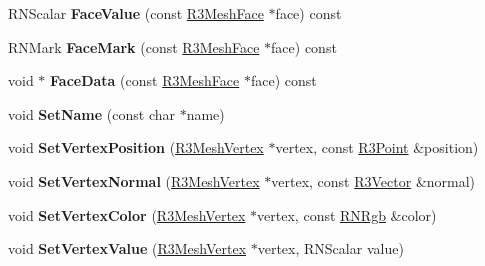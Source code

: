\begin{DoxyCompactItemize}
\item 
R\+N\+Scalar {\bfseries Face\+Value} (const \hyperlink{class_r3_mesh_face}{R3\+Mesh\+Face} $\ast$face) const \hypertarget{class_r3_mesh_a06524fba258d4d294f19f621079c6fc8}{}\label{class_r3_mesh_a06524fba258d4d294f19f621079c6fc8}

\item 
R\+N\+Mark {\bfseries Face\+Mark} (const \hyperlink{class_r3_mesh_face}{R3\+Mesh\+Face} $\ast$face) const \hypertarget{class_r3_mesh_a766b1c1ff18ecdb72a1a02b93cb4961e}{}\label{class_r3_mesh_a766b1c1ff18ecdb72a1a02b93cb4961e}

\item 
void $\ast$ {\bfseries Face\+Data} (const \hyperlink{class_r3_mesh_face}{R3\+Mesh\+Face} $\ast$face) const \hypertarget{class_r3_mesh_a62c2b5b91b088723a9e27957b236fc7a}{}\label{class_r3_mesh_a62c2b5b91b088723a9e27957b236fc7a}

\item 
void {\bfseries Set\+Name} (const char $\ast$name)\hypertarget{class_r3_mesh_a1760d7cc850b02a2050b75c07ccdaaa2}{}\label{class_r3_mesh_a1760d7cc850b02a2050b75c07ccdaaa2}

\item 
void {\bfseries Set\+Vertex\+Position} (\hyperlink{class_r3_mesh_vertex}{R3\+Mesh\+Vertex} $\ast$vertex, const \hyperlink{class_r3_point}{R3\+Point} \&position)\hypertarget{class_r3_mesh_ac9a8c8b377f19b9f2156d9aa3ba7d388}{}\label{class_r3_mesh_ac9a8c8b377f19b9f2156d9aa3ba7d388}

\item 
void {\bfseries Set\+Vertex\+Normal} (\hyperlink{class_r3_mesh_vertex}{R3\+Mesh\+Vertex} $\ast$vertex, const \hyperlink{class_r3_vector}{R3\+Vector} \&normal)\hypertarget{class_r3_mesh_a5675803db6c1489e102122de897adb3c}{}\label{class_r3_mesh_a5675803db6c1489e102122de897adb3c}

\item 
void {\bfseries Set\+Vertex\+Color} (\hyperlink{class_r3_mesh_vertex}{R3\+Mesh\+Vertex} $\ast$vertex, const \hyperlink{class_r_n_rgb}{R\+N\+Rgb} \&color)\hypertarget{class_r3_mesh_ac007c0127c53eed24d7d815dc02fb461}{}\label{class_r3_mesh_ac007c0127c53eed24d7d815dc02fb461}

\item 
void {\bfseries Set\+Vertex\+Value} (\hyperlink{class_r3_mesh_vertex}{R3\+Mesh\+Vertex} $\ast$vertex, R\+N\+Scalar value)\hypertarget{class_r3_mesh_a71bbcf55a07661e10a519556b18f2f27}{}\label{class_r3_mesh_a71bbcf55a07661e10a519556b18f2f27}


\end{DoxyCompactItemize}
